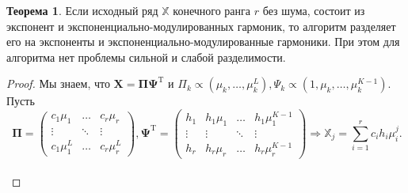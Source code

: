 \documentclass[specialist, substylefile = spbureport.rtx, subf,href,colorlinks=true, 12pt]{disser}
\theoremstyle{definition}
\newtheorem{theorem}{Теорема}
\begin{document}
\begin{theorem}
Если исходный ряд $\mathbb{X}$ конечного ранга $r$ без шума, состоит из экспонент и экспоненциально-модулированных гармоник, то алгоритм разделяет его на экспоненты и экспоненциально-модулированные гармоники. При этом для алгоритма нет проблемы сильной и слабой разделимости.
\end{theorem}
\begin{proof}
Мы знаем, что $\mathbf{X} = \mathbf{\Pi\Psi}^{\mathrm{T}}$ и $\Pi_k \propto (\mu_k, \dots ,\mu^L_k), \Psi_k \propto (1, \mu_k, \dots ,\mu^{K-1}_k)$. Пусть 
\begin{equation*}\
    \mathbf{\Pi} = \begin{pmatrix}
        c_1\mu_1 & \dots & c_r\mu_r \\
        \vdots & \ddots & \vdots \\
        c_1\mu_1^L & \dots & c_r\mu_r^L
    \end{pmatrix}, \mathbf{\Psi}^{\mathrm{T}} = 
    \begin{pmatrix}
        h_1 & h_1\mu_1 & \dots & h_1\mu_1^{K - 1} \\
        \vdots & \vdots & \ddots & \vdots \\
        h_r & h_r\mu_r & \dots & h_r\mu_r^{K - 1}
    \end{pmatrix} \Rightarrow  \mathbb{X}_j = \sum_{i = 1}^{r}c_i h_i \mu_i^j.
\end{equation*} \\



\end{proof}
\end{document}
